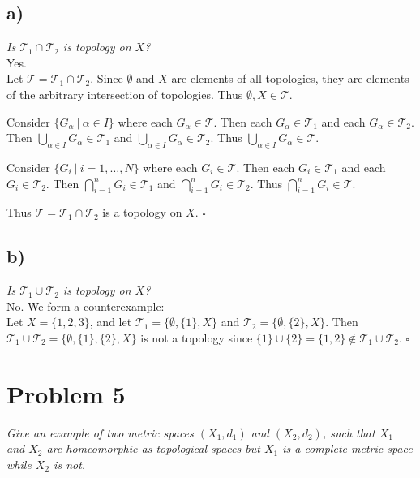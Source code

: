 \documentclass[12pt]{article}
\theoremstyle{plain}
\begin{document}
\subsection*{ a)}
\emph{Is $\mathcal{T}_1 \cap \mathcal{T}_2$ is topology on $X$?}\\

Yes. \\

Let $\mathcal{T} = \mathcal{T}_1 \cap \mathcal{T_2}$.  Since $\emptyset$ and $X$ are elements of all topologies, they are elements of the arbitrary intersection of topologies.  Thus $\emptyset, X \in \mathcal{T}$.

Consider $\{G_\alpha\ |\ \alpha \in I\}$ where each $G_\alpha \in \mathcal{T}$.  Then each $G_\alpha \in \mathcal{T}_1$ and each $G_\alpha \in \mathcal{T}_2$.  Then $\bigcup_{\alpha\in I}G_\alpha \in \mathcal{T}_1$ and $\bigcup_{\alpha\in I}G_\alpha \in \mathcal{T}_2$.  Thus $\bigcup_{\alpha\in I}G_\alpha \in \mathcal{T}$.

Consider $\{G_i\ |\ i = 1, \dots, N\}$ where each $G_i \in \mathcal{T}$.  Then each $G_i \in \mathcal{T}_1$ and each $G_i \in \mathcal{T}_2$.  Then $\bigcap_{i=1}^n G_i \in \mathcal{T}_1$ and $\bigcap_{i=1}^n G_i \in \mathcal{T}_2$.  Thus $\bigcap_{i=1}^n G_i \in \mathcal{T}$.

Thus $\mathcal{T} = \mathcal{T}_1 \cap \mathcal{T}_2$ is a topology on $X$. \hfill $\square$

\subsection*{ b)}
\emph{Is $\mathcal{T}_1 \cup \mathcal{T}_2$ is topology on $X$?}\\

No. We form a counterexample:\\

Let $X = \{1, 2, 3\}$, and let $\mathcal{T}_1 = \{\emptyset, \{1\}, X\}$ and $\mathcal{T}_2 = \{\emptyset, \{2\}, X\}$.  Then $\mathcal{T}_1 \cup \mathcal{T}_2 = \{\emptyset, \{1\}, \{2\}, X\}$ is not a topology since $\{1\}\cup \{2\} = \{1, 2\} \notin \mathcal{T}_1 \cup \mathcal{T}_2$. \hfill $\square$

\section*{Problem 5}
\emph{Give an example of two metric spaces $(X_1, d_1)$ and $(X_2, d_2)$, such that $X_1$ and $X_2$ are homeomorphic as topological spaces but $X_1$ is a complete metric space while $X_2$ is not.} \\
\end{document}
